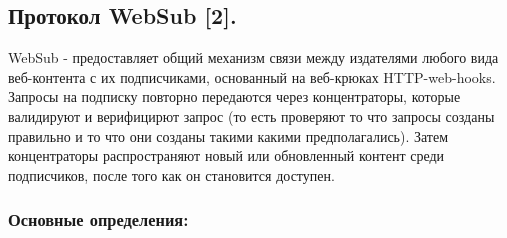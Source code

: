 \hypertarget{ux43fux440ux43eux442ux43eux43aux43eux43b-websub-2}{%
\subsection{Протокол WebSub
{[}2{]}.}\label{ux43fux440ux43eux442ux43eux43aux43eux43b-websub-2}}

WebSub - предоставляет общий механизм связи между издателями любого вида
веб-контента с их подписчиками, основанный на веб-крюках HTTP-web-hooks.
Запросы на подписку повторно передаются через концентраторы, которые
валидируют и верифицирют запрос (то есть проверяют то что запросы
созданы правильно и то что они созданы такими какими предполагались).
Затем концентраторы распространяют новый или обновленный контент среди
подписчиков, после того как он становится доступен.

\hypertarget{ux43eux441ux43dux43eux432ux43dux44bux435-ux43eux43fux440ux435ux434ux435ux43bux435ux43dux438ux44f}{%
\subsubsection{Основные
определения:}\label{ux43eux441ux43dux43eux432ux43dux44bux435-ux43eux43fux440ux435ux434ux435ux43bux435ux43dux438ux44f}}

